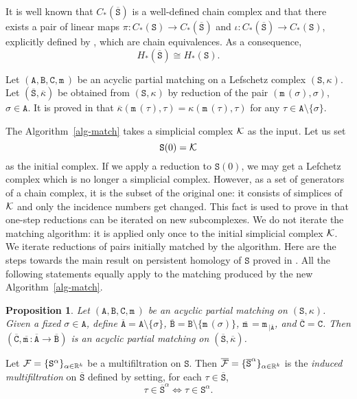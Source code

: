\documentclass[12pt]{article}
\newtheorem{prop}[thm]{Proposition}
\newcommand{\R}{{\mathbb R}}
\newcommand{\cF}{{\cal F}}
\newcommand{\cK}{{\cal K}}
\newcommand{\ma}{\texttt{m}\,} \newcommand{\re}{\texttt{r}\,}
\newcommand{\sS}{\texttt{S}} \newcommand{\sA}{\texttt{A}}
\newcommand{\sB}{\texttt{B}}
\newcommand{\sC}{\texttt{C}} \newcommand{\sD}{\texttt{D}} \newcommand{\sM}{\texttt{M}} \newcommand{\sL}{\texttt{L}}
\begin{document}
It is well known \cite{KaMrSl98} that $C_*(\overline{\sS})$ is a well-defined chain complex and that there exists a pair of linear maps $\pi: C_*(\sS)\to C_*(\overline{\sS})$ and $\iota: C_*(\overline{\sS})\to C_*(\sS)$, explicitly defined by \cite[Formulas (3,4)]{AlKaLa17}, which are chain equivalences. As a consequence,
\begin{equation}\label{eq:H-S=Sbar}
H_*(\overline{\sS})\cong H_*(\sS).
\end{equation}

Let  $(\sA,\sB,\sC,\ma)$ be an acyclic partial matching  on a Lefschetz complex $(\sS, \kappa)$. Let $(\overline{\sS}, \overline{\kappa})$ be obtained from $(\sS,\kappa)$ by reduction of the pair $(\ma(\sigma),\sigma)$, $\sigma\in \sA$. It is proved in \cite{AlKaLa17} that $\overline{\kappa}(\ma(\tau),\tau)=\kappa(\ma(\tau),\tau)$ for any $\tau\in \sA\setminus \{\sigma\}$.

The Algorithm~\ref{alg-match} takes a simplicial complex $\cK$ as the input. Let us set
\[
\sS(0)=\cK
\]
as the initial complex. If we apply a reduction to $\sS(0)$, we may get a Lefchetz complex which is no longer a simplicial complex. However, as a set of generators of a chain complex, it is the subset of the original one: it consists of simplices of $\cK$ and only the incidence numbers get changed. This fact is used to prove in \cite{AlKaLa17} that one-step reductions can be iterated on new subcomplexes. We do not iterate the matching algorithm: it is applied only once to the initial simplicial complex $\cK$. We iterate reductions of pairs initially matched by the algorithm. Here are the steps towards the main result on persistent homology of $\sS$ proved in \cite{AlKaLa17}. All the following statements equally apply to the matching produced by the new Algorithm~\ref{alg-match}.

\begin{prop}\label{prop:reduced-matching}
Let  $(\sA,\sB,\sC,\ma)$ be an acyclic partial matching on $(\sS,\kappa)$. Given a fixed $\sigma\in \sA$,
define $\overline{\sA}=\sA\setminus \{\sigma\}$,
$\overline{\sB}=\sB\setminus \{\ma(\sigma)\}$, $\overline{\ma}=\ma_{|\overline{\sA}}$, and $\overline{\sC}=\sC$.
Then $(\overline{\sC},\overline{\ma}:\overline{\sA}\to \overline{\sB})$ is an acyclic partial matching on $(\overline{\sS},\overline{\kappa})$.
\end{prop}

Let ${\cF}=\{\sS^\alpha\}_{\alpha\in\R^k}$ be a multifiltration on $\sS$. Then $\overline{\cF}=\{\overline{\sS}^\alpha\}_{\alpha\in\R^k}$ is the {\em induced multifiltration} on
$\overline{\sS}$ defined by setting, for each $\tau \in \overline{\sS}$,
\[
\tau \in \overline{\sS}^\alpha \iff \tau\in \sS^\alpha.
\]
\end{document}
